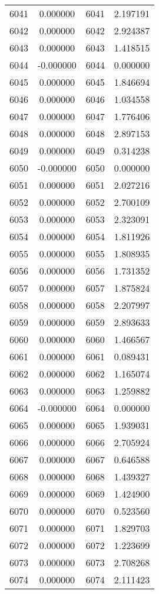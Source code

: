 \documentclass[12pt]{article}
\begin{document}
\begin{longtable}{@{}cccc@{}}
6041 & 0.000000 & 6041 & 2.197191 \\
6042 & 0.000000 & 6042 & 2.924387 \\
6043 & 0.000000 & 6043 & 1.418515 \\
6044 & -0.000000 & 6044 & 0.000000 \\
6045 & 0.000000 & 6045 & 1.846694 \\
6046 & 0.000000 & 6046 & 1.034558 \\
6047 & 0.000000 & 6047 & 1.776406 \\
6048 & 0.000000 & 6048 & 2.897153 \\
6049 & 0.000000 & 6049 & 0.314238 \\
6050 & -0.000000 & 6050 & 0.000000 \\
6051 & 0.000000 & 6051 & 2.027216 \\
6052 & 0.000000 & 6052 & 2.700109 \\
6053 & 0.000000 & 6053 & 2.323091 \\
6054 & 0.000000 & 6054 & 1.811926 \\
6055 & 0.000000 & 6055 & 1.808935 \\
6056 & 0.000000 & 6056 & 1.731352 \\
6057 & 0.000000 & 6057 & 1.875824 \\
6058 & 0.000000 & 6058 & 2.207997 \\
6059 & 0.000000 & 6059 & 2.893633 \\
6060 & 0.000000 & 6060 & 1.466567 \\
6061 & 0.000000 & 6061 & 0.089431 \\
6062 & 0.000000 & 6062 & 1.165074 \\
6063 & 0.000000 & 6063 & 1.259882 \\
6064 & -0.000000 & 6064 & 0.000000 \\
6065 & 0.000000 & 6065 & 1.939031 \\
6066 & 0.000000 & 6066 & 2.705924 \\
6067 & 0.000000 & 6067 & 0.646588 \\
6068 & 0.000000 & 6068 & 1.439327 \\
6069 & 0.000000 & 6069 & 1.424900 \\
6070 & 0.000000 & 6070 & 0.523560 \\
6071 & 0.000000 & 6071 & 1.829703 \\
6072 & 0.000000 & 6072 & 1.223699 \\
6073 & 0.000000 & 6073 & 2.708268 \\
6074 & 0.000000 & 6074 & 2.111423 \\

\end{longtable}
\end{document}
